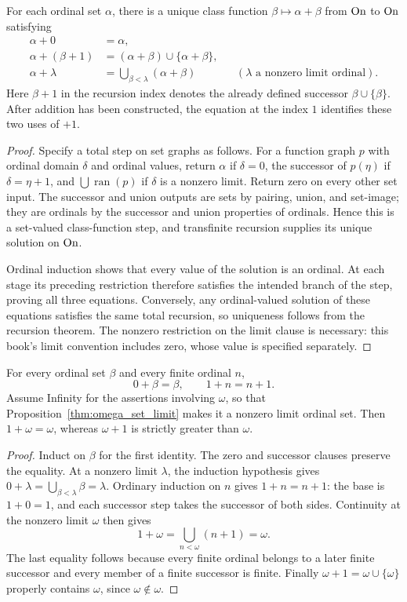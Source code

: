 \begin{theorem}
For each ordinal set $\alpha$, there is a unique class function
$\beta\mapsto\alpha+\beta$ from $\mathrm{On}$ to $\mathrm{On}$ satisfying
\[
\begin{aligned}
\alpha+0&=\alpha,\\
\alpha+(\beta+1)&=(\alpha+\beta)\cup\{\alpha+\beta\},\\
\alpha+\lambda&=\bigcup_{\beta<\lambda}(\alpha+\beta)
   &&(\lambda\text{ a nonzero limit ordinal}).
\end{aligned}
\]
Here $\beta+1$ in the recursion index denotes the already defined
successor $\beta\cup\{\beta\}$. After addition has been constructed,
the equation at the index $1$ identifies these two uses of $+1$.
\end{theorem}
\begin{proof}
Specify a total step on set graphs as follows. For a function graph $p$
with ordinal domain $\delta$ and ordinal values, return $\alpha$ if
$\delta=0$, the successor of $p(\eta)$ if $\delta=\eta+1$, and
$\bigcup\operatorname{ran}(p)$ if $\delta$ is a nonzero limit.
Return zero on every other set input. The successor and union outputs
are sets by pairing, union, and set-image; they are ordinals by the
successor and union properties of ordinals. Hence this is a set-valued
class-function step, and transfinite recursion supplies its unique
solution on $\mathrm{On}$.

Ordinal induction shows that every value of the solution is an ordinal.
At each stage its preceding restriction therefore satisfies the intended
branch of the step, proving all three equations. Conversely, any
ordinal-valued solution of these equations satisfies the same total
recursion, so uniqueness follows from the recursion theorem. The
nonzero restriction on the limit clause is necessary: this book's
limit convention includes zero, whose value is specified separately.
\end{proof}

\begin{proposition}
For every ordinal set $\beta$ and every finite ordinal $n$,
\[
0+\beta=\beta,\qquad 1+n=n+1.
\]
Assume Infinity for the assertions involving $\omega$, so that
Proposition~\ref{thm:omega_set_limit} makes it a nonzero limit ordinal
set. Then $1+\omega=\omega$, whereas $\omega+1$ is strictly greater
than $\omega$.
\end{proposition}
\begin{proof}
Induct on $\beta$ for the first identity. The zero and successor
clauses preserve the equality. At a nonzero limit $\lambda$, the
induction hypothesis gives $0+\lambda=\bigcup_{\beta<\lambda}\beta
=\lambda$. Ordinary induction on $n$ gives $1+n=n+1$: the base
is $1+0=1$, and each successor step takes the successor of both sides.
Continuity at the nonzero limit $\omega$ then gives
\[
1+\omega=\bigcup_{n<\omega}(n+1)=\omega.
\]
The last equality follows because every finite ordinal belongs to a
later finite successor and every member of a finite successor is finite.
Finally $\omega+1=\omega\cup\{\omega\}$ properly contains $\omega$,
since $\omega\notin\omega$.
\end{proof}

